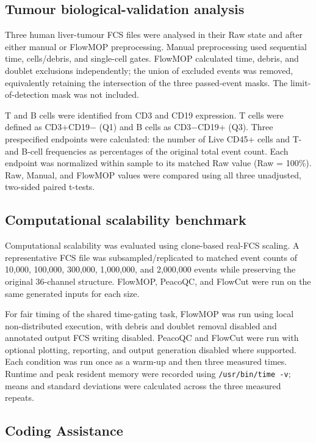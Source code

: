 \documentclass[ASNA]{latex/wiley/USG}
\begin{document}
\subsection{Tumour biological-validation
analysis}\label{tumour-biological-validation-analysis}

Three human liver-tumour FCS files were analysed in their Raw state and
after either manual or FlowMOP preprocessing. Manual preprocessing used
sequential time, cells/debris, and single-cell gates. FlowMOP calculated
time, debris, and doublet exclusions independently; the union of
excluded events was removed, equivalently retaining the intersection of
the three passed-event masks. The limit-of-detection mask was not
included.

T and B cells were identified from CD3 and CD19 expression. T cells were
defined as CD3+CD19− (Q1) and B cells as CD3−CD19+ (Q3). Three
prespecified endpoints were calculated: the number of Live CD45+ cells
and T- and B-cell frequencies as percentages of the original total event
count. Each endpoint was normalized within sample to its matched Raw
value (Raw = 100\%). Raw, Manual, and FlowMOP values were compared using
all three unadjusted, two-sided paired t-tests.

\subsection{Computational scalability
benchmark}\label{computational-scalability-benchmark}

Computational scalability was evaluated using clone-based real-FCS
scaling. A representative FCS file was subsampled/replicated to matched
event counts of 10,000, 100,000, 300,000, 1,000,000, and 2,000,000
events while preserving the original 36-channel structure. FlowMOP,
PeacoQC, and FlowCut were run on the same generated inputs for each
size.

For fair timing of the shared time-gating task, FlowMOP was run using
local non-distributed execution, with debris and doublet removal
disabled and annotated output FCS writing disabled. PeacoQC and FlowCut
were run with optional plotting, reporting, and output generation
disabled where supported. Each condition was run once as a warm-up and
then three measured times. Runtime and peak resident memory were
recorded using \texttt{/usr/bin/time\ -v}; means and standard deviations
were calculated across the three measured repeats.

\subsection{Coding Assistance}\label{coding-assistance}
\end{document}
